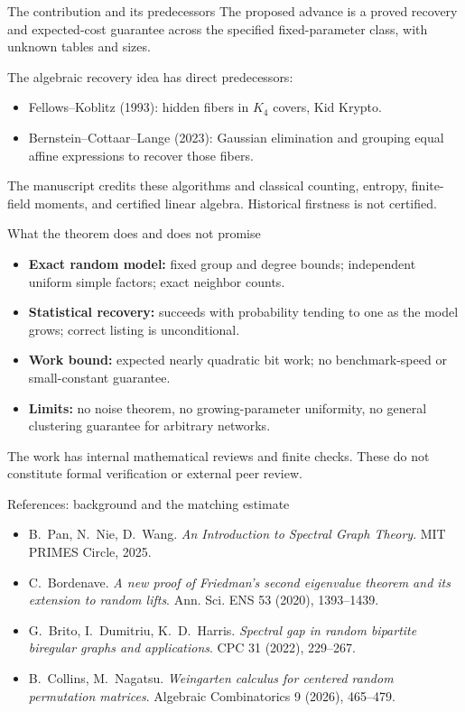 \documentclass[aspectratio=169,11pt]{beamer}
\begin{document}
\begin{frame}{The contribution and its predecessors}
The proposed advance is a proved recovery and expected-cost guarantee
across the specified fixed-parameter class, with unknown tables and sizes.

The algebraic recovery idea has direct predecessors:
\begin{itemize}
\item Fellows--Koblitz (1993): hidden fibers in $K_4$ covers, Kid Krypto.
\item Bernstein--Cottaar--Lange (2023): Gaussian elimination and grouping
equal affine expressions to recover those fibers.
\end{itemize}
The manuscript credits these algorithms and classical counting, entropy,
finite-field moments, and certified linear algebra.
Historical firstness is not certified.
\end{frame}

\begin{frame}{What the theorem does and does not promise}
\begin{itemize}
\item \textbf{Exact random model:} fixed group and degree bounds;
independent uniform simple factors; exact neighbor counts.
\item \textbf{Statistical recovery:} succeeds with probability tending to
one as the model grows; correct listing is unconditional.
\item \textbf{Work bound:} expected nearly quadratic bit work;
no benchmark-speed or small-constant guarantee.
\item \textbf{Limits:} no noise theorem, no growing-parameter uniformity,
no general clustering guarantee for arbitrary networks.
\end{itemize}
The work has internal mathematical reviews and finite checks.
These do not constitute formal verification or external peer review.
\end{frame}

\begin{frame}{References: background and the matching estimate}
\small
\begin{itemize}
\item B.~Pan, N.~Nie, D.~Wang.
\emph{An Introduction to Spectral Graph Theory}. MIT PRIMES Circle, 2025.
\item C.~Bordenave. \emph{A new proof of Friedman's second eigenvalue theorem
and its extension to random lifts}. Ann. Sci. ENS 53 (2020), 1393--1439.
\item G.~Brito, I.~Dumitriu, K.~D.~Harris.
\emph{Spectral gap in random bipartite biregular graphs and applications}.
CPC 31 (2022), 229--267.
\item B.~Collins, M.~Nagatsu. \emph{Weingarten calculus for centered random
permutation matrices}. Algebraic Combinatorics 9 (2026), 465--479.
\end{itemize}
\end{frame}
\end{document}
